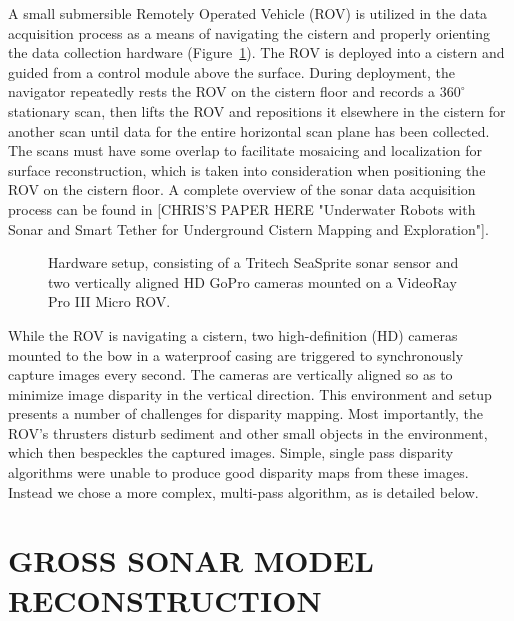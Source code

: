 \documentclass[a4paper,twoside]{article}
\begin{document}
\noindent A small submersible Remotely Operated Vehicle (ROV) is utilized in the data acquisition process as a means of navigating the cistern and properly orienting the data collection hardware (Figure~\ref{fig:ROV}). The ROV is deployed into a cistern and guided from a control module above the surface. During deployment, the navigator repeatedly rests the ROV on the cistern floor and records a $360^{\circ}$ stationary scan, then lifts the ROV and repositions it elsewhere in the cistern for another scan until data for the entire horizontal scan plane has been collected. The scans must have some overlap to facilitate mosaicing and localization for surface reconstruction, which is taken into consideration when positioning the ROV on the cistern floor. A complete overview of the sonar data acquisition process can be found in [CHRIS'S PAPER HERE "Underwater Robots with Sonar and Smart Tether for Underground Cistern Mapping and Exploration"].
\begin{figure}[!h]
   \vspace{-0.2cm}
   \caption{Hardware setup, consisting of a Tritech SeaSprite sonar sensor and two vertically aligned HD GoPro cameras mounted on a VideoRay Pro III Micro ROV.}
  \label{fig:ROV}
 \end{figure}

While the ROV is navigating a cistern, two high-definition (HD) cameras mounted to the bow in a waterproof casing are triggered to synchronously capture images every second. The cameras are vertically aligned so as to minimize image disparity in the vertical direction. 
This environment and setup presents a number of challenges for disparity mapping.  
Most importantly, the ROV's thrusters disturb sediment and other small objects in the environment, which then bespeckles the captured images.
Simple, single pass disparity algorithms were unable to produce good disparity maps from these images.  Instead we chose a more complex, multi-pass algorithm, as is detailed below. 

\section{\uppercase{Gross sonar Model Reconstruction}}
\label{sec:reconstruction}

\end{document}
